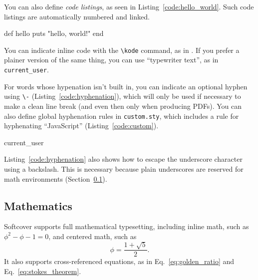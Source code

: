 You can also define \emph{code listings}, as seen in Listing~\ref{code:hello_world}. Such code listings are automatically numbered and linked.

\begin{codelisting}
\label{code:hello_world}
\begin{code}
def hello
  puts "hello, world!"
end
\end{code}
\end{codelisting}

You can indicate inline code with the \verb+\kode+ command, as in . If you prefer a plainer version of the same thing, you can use ``typewriter text'', as in \texttt{current\_\-user}.

For words whose hypenation isn't built in, you can indicate an optional hyphen using \verb+\-+ (Listing~\ref{code:hyphenation}), which will only be used if necessary to make a clean line break (and even then only when producing PDFs). You can also define global hyphenation rules in \texttt{custom.sty}, which includes a rule for hyphenating ``JavaScript'' (Listing~\ref{code:custom}).

\begin{codelisting}
\label{code:hyphenation}
\begin{code}
current\_\-user
\end{code}
\end{codelisting}

\begin{codelisting}
\label{code:custom}
\end{codelisting}

Listing~\ref{code:hyphenation} also shows how to escape the underscore character using a backslash. This is necessary because plain underscores are reserved for math environments (Section~\ref{sec:mathematics}).

\subsection{Mathematics}
\label{sec:mathematics}

Softcover supports full mathematical typesetting, including inline math, such as $\phi^2 - \phi - 1 = 0$, and centered math, such as
\[ \phi = \frac{1+\sqrt{5}}{2}. \]
It also supports cross-referenced equations, as in Eq.~\eqref{eq:golden_ratio} and Eq.~\eqref{eq:stokes_theorem}.

